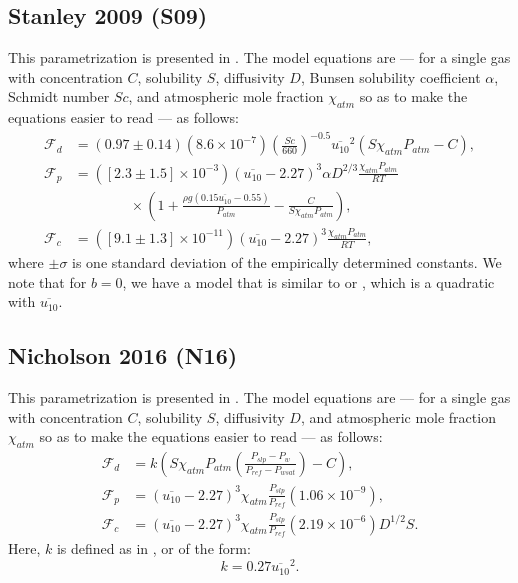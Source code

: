 \documentclass[11pt]{article}
\newcommand{\F}{\mathcal{F}}  %
\begin{document}
\subsection*{Stanley 2009 (S09)}

This parametrization is presented in \cite{stanley2009}.
The model equations are --- for a single gas with concentration $C$, solubility $S$, diffusivity $D$, Bunsen solubility coefficient $\alpha$, Schmidt number $Sc$, and atmospheric mole fraction $\chi_{atm}$ so as to make the equations easier to read --- as follows:
\begin{align}
	\F_d &= \left(0.97 \pm 0.14 \right)\left(8.6 \times 10^{-7}\right)\left(\frac{Sc}{660}\right)^{-0.5}\overline{u_{10}}^{2}\left(S\chi_{atm}P_{atm} - C\right), \\
	\F_p &= \left(\left[2.3 \pm 1.5\right] \times 10^{-3} \right)\left(\overline{u_{10}} - 2.27\right)^{3} \alpha D^{2 / 3} \frac{\chi_{atm} P_{atm}}{RT} \\ &\quad\quad\quad\quad \times \left(1 + \frac{\rho g \left(0.15\overline{u_{10}} - 0.55\right)}{P_{atm}} - \frac{C}{S\chi_{atm}P_{atm}} \right), \\
	\F_c &= \left(\left[9.1 \pm 1.3\right]\times 10^{-11}\right)\left(\overline{u_{10}}-2.27\right)^3 \frac{\chi_{atm}P_{atm}}{RT},
\end{align}
where $\pm \sigma$ is one standard deviation of the empirically determined constants.
We note that for $b=0$, we have a model that is similar to \cite{wanninkhof1992} or \cite{sweeney2007}, which is a quadratic with $\overline{u_{10}}$.

\subsection*{Nicholson 2016 (N16)}

This parametrization is presented in \cite{nicholson2016}.
The model equations are --- for a single gas with concentration $C$, solubility $S$, diffusivity $D$, and atmospheric mole fraction $\chi_{atm}$ so as to make the equations easier to read --- as follows:
\begin{align}
	\F_d &= k\left(S\chi_{atm}P_{atm}\left( \frac{P_{slp} - P_w}{P_{ref} - P_{wsat}}\right) - C\right), \\
	\F_p &= \left(\overline{u_{10}} - 2.27\right)^3\chi_{atm}\frac{P_{slp}}{P_{ref}}\left(1.06 \times 10^{-9}\right), \\
	\F_c &= \left(\overline{u_{10}} - 2.27\right)^3\chi_{atm} \frac{P_{slp}}{P_{ref}} \left(2.19 \times 10^{-6}\right)D^{1 / 2}S.
\end{align}
Here, $k$ is defined as in \cite{sweeney2007}, or of the form:
\begin{equation}
	k = 0.27 \overline{u_{10}}^2.
\end{equation}
\end{document}
